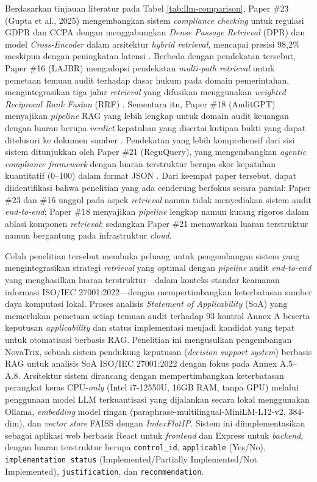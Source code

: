 \documentclass[bachelor,bahasa]{thesisdtetiugm}
\begin{document}
Berdasarkan tinjauan literatur pada Tabel \ref{tab:llm-comparison}, Paper \#23 (Gupta et al., 2025) mengembangkan sistem \textit{compliance checking} untuk regulasi GDPR dan CCPA dengan menggabungkan \textit{Dense Passage Retrieval} (DPR) dan model \textit{Cross-Encoder} dalam arsitektur \textit{hybrid retrieval}, mencapai presisi 98,2\% meskipun dengan peningkatan latensi \cite{gupta2025compliance}. Berbeda dengan pendekatan tersebut, Paper \#16 (LAJBR) mengadopsi pendekatan \textit{multi-path retrieval} untuk pemetaan temuan audit terhadap dasar hukum pada domain pemerintahan, mengintegrasikan tiga jalur \textit{retrieval} yang difusikan menggunakan \textit{weighted Reciprocal Rank Fusion} (RRF) \cite{lajbr2025}. Sementara itu, Paper \#18 (AuditGPT) menyajikan \textit{pipeline} RAG yang lebih lengkap untuk domain audit keuangan dengan luaran berupa \textit{verdict} kepatuhan yang disertai kutipan bukti yang dapat ditelusuri ke dokumen sumber \cite{auditgpt2025}. Pendekatan yang lebih komprehensif dari sisi sistem ditunjukkan oleh Paper \#21 (ReguQuery), yang mengembangkan \textit{agentic compliance framework} dengan luaran terstruktur berupa skor kepatuhan kuantitatif (0--100) dalam format JSON \cite{reguquery2025}. Dari keempat paper tersebut, dapat diidentifikasi bahwa penelitian yang ada cenderung berfokus secara parsial: Paper \#23 dan \#16 unggul pada aspek \textit{retrieval} namun tidak menyediakan sistem audit \textit{end-to-end}; Paper \#18 menyajikan \textit{pipeline} lengkap namun kurang rigoros dalam ablasi komponen \textit{retrieval}; sedangkan Paper \#21 menawarkan luaran terstruktur namun bergantung pada infrastruktur \textit{cloud}.

Celah penelitian tersebut membuka peluang untuk pengembangan sistem yang mengintegrasikan strategi \textit{retrieval} yang optimal dengan \textit{pipeline} audit \textit{end-to-end} yang menghasilkan luaran terstruktur---dalam konteks standar keamanan informasi ISO/IEC 27001:2022---dengan mempertimbangkan keterbatasan sumber daya komputasi lokal. Proses analisis \textit{Statement of Applicability} (SoA) yang memerlukan pemetaan setiap temuan audit terhadap 93 kontrol Annex A beserta keputusan \textit{applicability} dan status implementasi menjadi kandidat yang tepat untuk otomatisasi berbasis RAG. Penelitian ini mengusulkan pengembangan NovaTrix, sebuah sistem pendukung keputusan (\textit{decision support system}) berbasis RAG untuk analisis SoA ISO/IEC 27001:2022 dengan fokus pada Annex A.5--A.8. Arsitektur sistem dirancang dengan mempertimbangkan keterbatasan perangkat keras CPU-\textit{only} (Intel i7-12550U, 16GB RAM, tanpa GPU) melalui penggunaan model LLM terkuantisasi yang dijalankan secara lokal menggunakan Ollama, \textit{embedding} model ringan (paraphrase-multilingual-MiniLM-L12-v2, 384-dim), dan \textit{vector store} FAISS dengan \textit{IndexFlatIP}. Sistem ini diimplementasikan sebagai aplikasi web berbasis React untuk \textit{frontend} dan Express untuk \textit{backend}, dengan luaran terstruktur berupa \texttt{control\_id}, \texttt{applicable} (Yes/No), \texttt{implementation\_status} (Implemented/Partially Implemented/Not Implemented), \texttt{justification}, dan \texttt{recommendation}.
\end{document}
